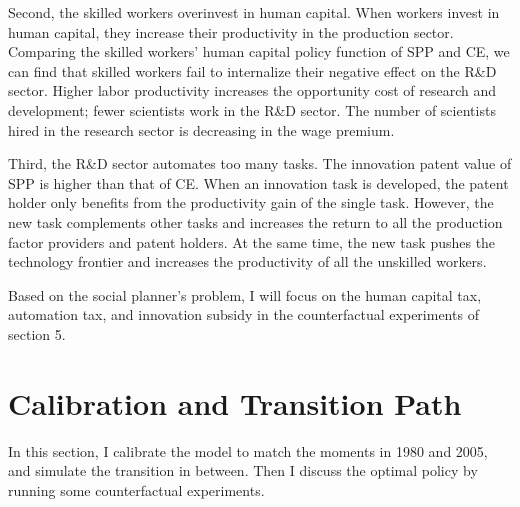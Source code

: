 \documentclass[12pt]{article}
\begin{document}
Second, the skilled workers overinvest in human capital. When workers invest in human capital, they increase their productivity in the production sector. Comparing the skilled workers' human capital policy function of SPP and CE, we can find that skilled workers fail to internalize their negative effect on the R\&D sector. Higher labor productivity increases the opportunity cost of research and development; fewer scientists work in the R\&D sector. The number of scientists hired in the research sector is decreasing in the wage premium.

Third, the R\&D sector automates too many tasks. The innovation patent value of SPP is higher than that of CE. When an innovation task is developed, the patent holder only benefits from the productivity gain of the single task. However, the new task complements other tasks and increases the return to all the production factor providers and patent holders. At the same time, the new task pushes the technology frontier and increases the productivity of all the unskilled workers. 

Based on the social planner's problem, I will focus on the human capital tax, automation tax, and innovation subsidy in the counterfactual experiments of section 5.

\section{Calibration and Transition Path}
In this section, I calibrate the model to match the moments in 1980 and 2005, and simulate the transition in between. Then I discuss the optimal policy by running some counterfactual experiments. 
\end{document}
